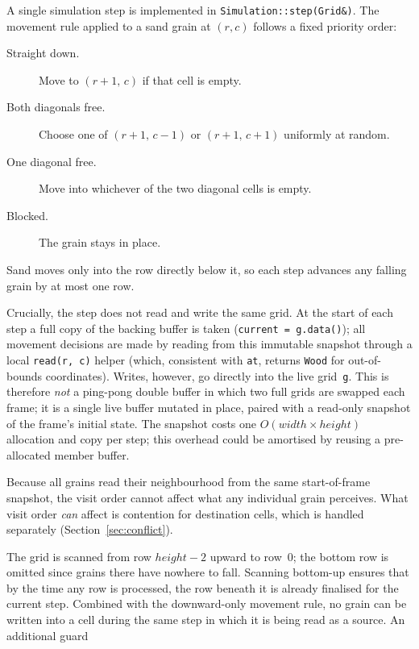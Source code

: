 \documentclass[oneside, a4paper, onecolumn, 11pt]{article}
\begin{document}
A single simulation step is implemented in \texttt{Simulation::step(Grid\&)}.
The movement rule applied to a sand grain at $(r,c)$ follows a fixed priority order:

\begin{description}
    \item[Straight down.] Move to $(r{+}1,\,c)$ if that cell is empty.
    \item[Both diagonals free.] Choose one of $(r{+}1,\,c{-}1)$ or $(r{+}1,\,c{+}1)$ uniformly at random.
    \item[One diagonal free.] Move into whichever of the two diagonal cells is empty.
    \item[Blocked.] The grain stays in place.
\end{description}

Sand moves only into the row directly below it, so each step advances any falling grain by at most one row.

Crucially, the step does not read and write the same grid.
At the start of each step a full copy of the backing buffer is taken (\texttt{current = g.data()}); all movement decisions are made by reading from this immutable snapshot through a local \texttt{read(r,\,c)} helper (which, consistent with \texttt{at}, returns \texttt{Wood} for out-of-bounds coordinates).
Writes, however, go directly into the live grid~\texttt{g}.
This is therefore \emph{not} a ping-pong double buffer in which two full grids are swapped each frame; it is a single live buffer mutated in place, paired with a read-only snapshot of the frame's initial state.
The snapshot costs one $O(\mathit{width} \times \mathit{height})$ allocation and copy per step; this overhead could be amortised by reusing a pre-allocated member buffer.

Because all grains read their neighbourhood from the same start-of-frame snapshot, the visit order cannot affect what any individual grain perceives.
What visit order \emph{can} affect is contention for destination cells, which is handled separately (Section~\ref{sec:conflict}).

The grid is scanned from row $\mathit{height}-2$ upward to row~$0$; the bottom row is omitted since grains there have nowhere to fall.
Scanning bottom-up ensures that by the time any row is processed, the row beneath it is already finalised for the current step. Combined with the downward-only movement rule, no grain can be written into a cell during the same step in which it is being read as a source.
An additional guard 
\end{document}

